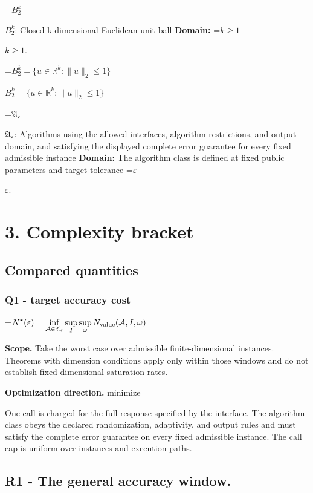 \documentclass[10pt,a4paper]{article}
\newcommand{\AtlasMath}[1]{\par\begingroup\centering\setbox0=\hbox{$\displaystyle #1$}\ifdim\wd0>1.4\linewidth\typeout{ATLAS WIDE FORMULA: \the\wd0}\fi\ifdim\wd0>\linewidth\resizebox{\linewidth}{!}{\box0}\else\box0\fi\par\endgroup}
\newcommand{\AtlasInlineMath}[1]{\begingroup\setbox0=\hbox{$#1$}\ifdim\wd0>.4\linewidth\endgroup\AtlasMath{#1}\else\endgroup$#1$\fi}
\begin{document}
\AtlasInlineMath{B_2^k}: Closed k-dimensional Euclidean unit ball \textbf{Domain:} \AtlasInlineMath{k\ge1}.



\AtlasInlineMath{B_2^k=\{u\in\mathbb R^k:\|u\|_2\le1\}}



\AtlasInlineMath{\mathfrak A_\varepsilon}: Algorithms using the allowed interfaces, algorithm restrictions, and output domain, and satisfying the displayed complete error guarantee for every fixed admissible instance \textbf{Domain:} The algorithm class is defined at fixed public parameters and target tolerance \AtlasInlineMath{\varepsilon}.



\section{3. Complexity bracket}


\subsection{Compared quantities}


\subsubsection{Q1 - target accuracy cost}


\AtlasMath{N^\star(\varepsilon)=\inf_{\mathcal A\in\mathfrak A_\varepsilon}\sup_I \sup_\omega N_{\rm value}(\mathcal A,I,\omega)}


\textbf{Scope.} Take the worst case over admissible finite-dimensional instances. Theorems with dimension conditions apply only within those windows and do not establish fixed-dimensional saturation rates.



\textbf{Optimization direction.} minimize



One call is charged for the full response specified by the interface. The algorithm class obeys the declared randomization, adaptivity, and output rules and must satisfy the complete error guarantee on every fixed admissible instance. The call cap is uniform over instances and execution paths.



\subsection{R1 - The general accuracy window.}
\end{document}
